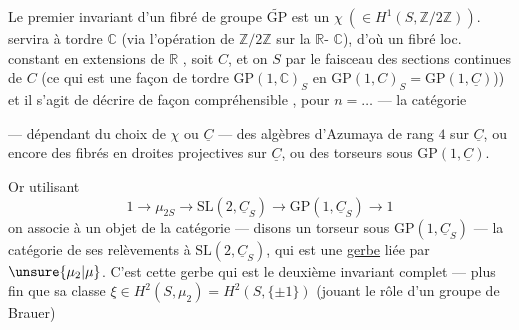 Le premier invariant d'un fibré de groupe $\widetilde{\mathrm{GP}}$
est un 
\uline{} $\chi\ (\in H^1(S,\mathbb Z/2\mathbb Z))$.
 servira à tordre $\mathbb C$
(via l'opération  de $\mathbb Z/2\mathbb Z$ sur
la $\mathbb R$- $\mathbb C$),  d'où un fibré loc.
constant en  extensions 
de $\mathbb R$ ,
soit $C$, et on   $S$
par le faisceau  des sections continues de
$C$ (ce qui est une façon de tordre
 $\mathrm{GP}(1,\mathbb C)_S$
en $\mathrm{GP}(1,C)_S=\mathrm{GP}(1,\underline C)$))
et il s'agit de  décrire de façon
compréhensible   
 , pour $n=\ldots$ --- la catégorie

--- dépendant du choix de $\chi$ ou $\underline C$ --- des
algèbres d'Azumaya de rang $4$ sur $\underline C$,
ou encore des fibrés en droites projectives
sur $\underline C$, ou des torseurs sous $\mathrm{GP}(1,\underline C)$.

Or utilisant  
\[
1\longrightarrow\mu_{2S}\longrightarrow\mathrm{SL}(2,\underline C_S)
\longrightarrow\mathrm{GP}(1,\underline C_S)\longrightarrow1
\]
on associe à un objet de la catégorie
--- disons un torseur sous $\mathrm{GP}(1,\underline C_S)$ --- la
catégorie  de ses relèvements à
$\mathrm{SL}(2,\underline C_S)$,
qui est une \uline{gerbe}  liée par $\unsure{\mu_2|\mu}$.
C'est cette gerbe qui est le deuxième
invariant complet --- plus fin que
sa classe  
$\xi\in H^2(S,\mu_2)=H^2(S,\{\pm1\})$
(jouant le rôle
d'un groupe de Brauer)


